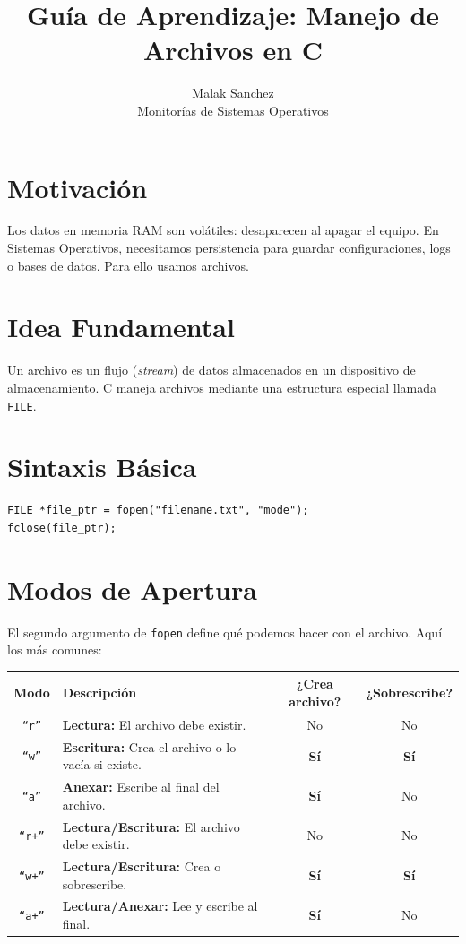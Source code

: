 \documentclass[12pt,a4paper]{article}
\title{\textbf{Guía de Aprendizaje: Manejo de Archivos en C}}
\author{Malak Sanchez \\ \small Monitorías de Sistemas Operativos}
\date{}
\begin{document}
\maketitle

\section{Motivación}
Los datos en memoria RAM son volátiles: desaparecen al apagar el equipo. En Sistemas Operativos, necesitamos persistencia para guardar configuraciones, logs o bases de datos. Para ello usamos archivos.

\section{Idea Fundamental}
Un archivo es un flujo (\textit{stream}) de datos almacenados en un dispositivo de almacenamiento. C maneja archivos mediante una estructura especial llamada \texttt{FILE}.

\section{Sintaxis Básica}
\begin{lstlisting}[numbers=none]
FILE *file_ptr = fopen("filename.txt", "mode");
fclose(file_ptr);
\end{lstlisting}

\section{Modos de Apertura}
El segundo argumento de \texttt{fopen} define qué podemos hacer con el archivo. Aquí los más comunes:

\begin{center}
\renewcommand{\arraystretch}{1.5}
\begin{tabular}{|c|l|c|c|}
\hline
\textbf{Modo} & \textbf{Descripción} & \textbf{¿Crea archivo?} & \textbf{¿Sobrescribe?} \\ \hline
\texttt{``r''} & \textbf{Lectura:} El archivo debe existir. & No & No \\ \hline
\texttt{``w''} & \textbf{Escritura:} Crea el archivo o lo vacía si existe. & \textbf{Sí} & \textbf{Sí} \\ \hline
\texttt{``a''} & \textbf{Anexar:} Escribe al final del archivo. & \textbf{Sí} & No \\ \hline
\texttt{``r+''} & \textbf{Lectura/Escritura:} El archivo debe existir. & No & No \\ \hline
\texttt{``w+''} & \textbf{Lectura/Escritura:} Crea o sobrescribe. & \textbf{Sí} & \textbf{Sí} \\ \hline
\texttt{``a+''} & \textbf{Lectura/Anexar:} Lee y escribe al final. & \textbf{Sí} & No \\ \hline
\end{tabular}
\end{center}
\end{document}

